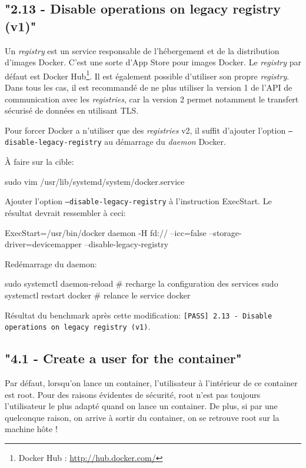 \documentclass[11pt,a4paper,oneside]{report}
\newcommand{\code}[1]{\texttt{#1}}
\begin{document}
\subsection{"2.13 - Disable operations on legacy registry (v1)"}
Un \textit{registry} est un service responsable de l'hébergement et de la distribution d'images Docker. C'est une sorte d'App Store pour images Docker. Le \textit{registry} par défaut est Docker Hub\footnote{Docker Hub : \url{http://hub.docker.com/}}. Il est également possible d'utiliser son propre \textit{registry}. Dans tous les cas, il est recommandé de ne plus utiliser la version 1 de l'API de communication avec les \textit{registries}, car la version 2 permet notamment le transfert sécurisé de données en utilisant TLS\cite{blog_docker_registry_v2}.

Pour forcer Docker a n'utiliser que des \textit{registries} v2, il suffit d'ajouter l'option \code{--disable-legacy-registry} au démarrage du \textit{daemon} Docker.

À faire sur la cible:

\begin{bashcode}
sudo vim /usr/lib/systemd/system/docker.service
\end{bashcode}

Ajouter l'option \code{--disable-legacy-registry} à l'instruction ExecStart. Le résultat devrait ressembler à ceci:

\begin{bashcode}
ExecStart=/usr/bin/docker daemon -H fd:// --icc=false --storage-driver=devicemapper --disable-legacy-registry
\end{bashcode}

Redémarrage du daemon:

\begin{bashcode}
sudo systemctl daemon-reload # recharge la configuration des services
sudo systemctl restart docker # relance le service docker
\end{bashcode}

Résultat du benchmark après cette modification: \code{[PASS] 2.13 - Disable operations on legacy registry (v1)}.


\subsection{"4.1  - Create a user for the container"}
Par défaut, lorsqu'on lance un container, l'utilisateur à l'intérieur de ce container est root. Pour des raisons évidentes de sécurité, root n'est pas toujours l'utilisateur le plus adapté quand on lance un container. De plus, si par une quelconque raison, on arrive à sortir du container, on se retrouve root sur la machine hôte !
\end{document}
